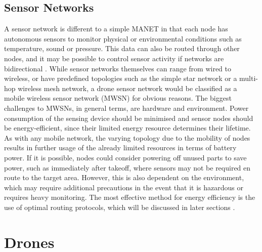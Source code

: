 \subsection{Sensor Networks}
A sensor network is different to a simple MANET in that each node has autonomous sensors to monitor physical or environmental conditions such as temperature, sound or pressure. This data can also be routed through other nodes, and it may be possible to control sensor activity if networks are bidirectional \cite{kazem2007}. While sensor networks themselves can range from wired to wireless, or have predefined topologies such as the simple star network or a multi-hop wireless mesh network, a drone sensor network would be classified as a mobile wireless sensor network (MWSN) for obvious reasons. 
The biggest challenges to MWSNs, in general terms, are hardware and environment. Power consumption of the sensing device should be minimised and sensor nodes should be energy-efficient, since their limited energy resource determines their lifetime. As with any mobile network, the varying topology due to the mobility of nodes results in further usage of the already limited resources in terms of battery power. If it is possible, nodes could consider powering off unused parts to save power, such as immediately after takeoff, where sensors may not be required en route to the target area. However, this is also dependent on the environment, which may require additional precautions in the event that it is hazardous or requires heavy monitoring. The most effective method for energy efficiency is the use of optimal routing protocols, which will be discussed in later sections \cite{shiny2012}.

\section{Drones}

